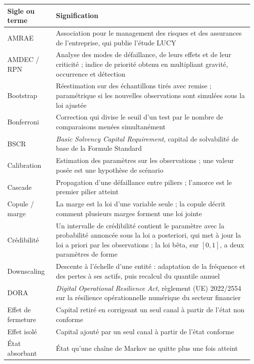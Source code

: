 \begin{center}\small
\renewcommand{\arraystretch}{1.05}
\begin{longtable}{@{}>{\raggedright\arraybackslash}p{2.6cm}>{\raggedright\arraybackslash}p{12.2cm}@{}}
\toprule
\textbf{Sigle ou terme} & \textbf{Signification} \\
\midrule
\endhead
AMRAE & Association pour le management des risques et des assurances de l'entreprise, qui publie l'étude LUCY \\
AMDEC / RPN & Analyse des modes de défaillance, de leurs effets et de leur criticité ; indice de priorité obtenu en multipliant gravité, occurrence et détection \\
Bootstrap & Réestimation sur des échantillons tirés avec remise ; paramétrique si les nouvelles observations sont simulées sous la loi ajustée \\
Bonferroni & Correction qui divise le seuil d'un test par le nombre de comparaisons menées simultanément \\
BSCR & \emph{Basic Solvency Capital Requirement}, capital de solvabilité de base de la Formule Standard \\
Calibration & Estimation des paramètres sur les observations ; une valeur posée est une hypothèse de scénario \\
Cascade & Propagation d'une défaillance entre piliers ; l'amorce est le premier pilier atteint \\
Copule / marge & La marge est la loi d'une variable seule ; la copule décrit comment plusieurs marges forment une loi jointe \\
Crédibilité & Un intervalle de crédibilité contient le paramètre avec la probabilité annoncée sous la loi a posteriori, qui met à jour la loi a priori par les observations ; la loi bêta, sur $[0,1]$, a deux paramètres de forme \\
Downscaling & Descente à l'échelle d'une entité : adaptation de la fréquence et des pertes à ses actifs, puis recalcul du quantile annuel \\
DORA & \emph{Digital Operational Resilience Act}, règlement (UE) 2022/2554 sur la résilience opérationnelle numérique du secteur financier \\
Effet de fermeture & Capital retiré en corrigeant un seul canal à partir de l'état non conforme \\
Effet isolé & Capital ajouté par un seul canal à partir de l'état conforme \\
État absorbant & État qu'une chaîne de Markov ne quitte plus une fois atteint \\

\end{longtable}
\end{center}
